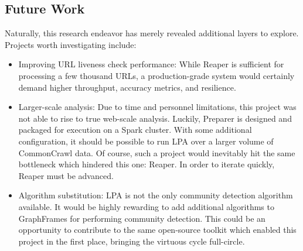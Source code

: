 \documentclass[conference]{IEEEtran}
\begin{document}
\subsection{Future Work}

Naturally, this research endeavor has merely revealed additional layers to explore. Projects worth investigating include:
\begin{itemize}
	\item Improving URL liveness check performance: While Reaper is sufficient for processing a few thousand URLs, a production-grade system would certainly demand higher throughput, accuracy metrics, and resilience.
	\item Larger-scale analysis: Due to time and personnel limitations, this project was not able to rise to true web-scale analysis. Luckily, Preparer is designed and packaged for execution on a Spark cluster. With some additional configuration, it should be possible to run LPA over a larger volume of CommonCrawl data. Of course, such a project would inevitably hit the same bottleneck which hindered this one: Reaper. In order to iterate quickly, Reaper must be advanced.
	\item Algorithm substitution: LPA is not the only community detection algorithm available. It would be highly rewarding to add additional algorithms to GraphFrames for performing community detection. This could be an opportunity to contribute to the same open-source toolkit which enabled this project in the first place, bringing the virtuous cycle full-circle.
\end{itemize}




\end{document}

